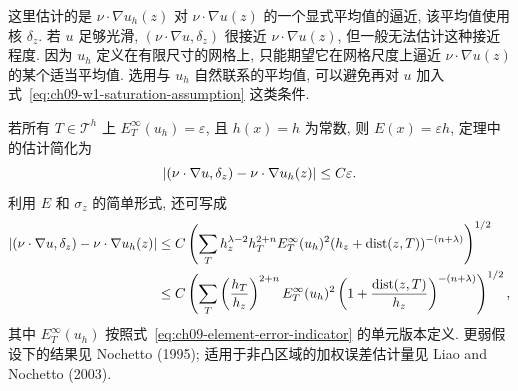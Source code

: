这里估计的是 $\nu\cdot\nabla u_h(z)$ 对 $\nu\cdot\nabla u(z)$ 的一个显式平均值的逼近, 该平均值使用核 $\delta_z$. 若 $u$ 足够光滑, $(\nu\cdot\nabla u,\delta_z)$ 很接近 $\nu\cdot\nabla u(z)$, 但一般无法估计这种接近程度. 因为 $u_h$ 定义在有限尺寸的网格上, 只能期望它在网格尺度上逼近 $\nu\cdot\nabla u(z)$ 的某个适当平均值. 选用与 $u_h$ 自然联系的平均值, 可以避免再对 $u$ 加入式~\eqref{eq:ch09-w1-saturation-assumption} 这类条件.

若所有 $T\in\mathcal T^h$ 上 $E_T^\infty(u_h)=\varepsilon$, 且 $h(x)=h$ 为常数, 则 $E(x)=\varepsilon h$, 定理中的估计简化为
\[
\MathBookFormulaID{formula-ch09-uniform-pointwise-estimator}
|(\nu\cdot\nabla u,\delta_z)-\nu\cdot\nabla u_h(z)|\leq C\varepsilon.
\]
利用 $E$ 和 $\sigma_z$ 的简单形式, 还可写成
\begin{align*}
\MathBookFormulaID{formula-ch09-discrete-pointwise-estimator}
|(\nu\cdot\nabla u,\delta_z)-\nu\cdot\nabla u_h(z)|
&\leq C\left(\sum_T h_z^{\lambda-2}h_T^{2+n}E_T^\infty(u_h)^2
(h_z+\operatorname{dist}(z,T))^{-(n+\lambda)}\right)^{1/2}\\
&\leq C\left(\sum_T\left(\frac{h_T}{h_z}\right)^{2+n}
E_T^\infty(u_h)^2
\left(1+\frac{\operatorname{dist}(z,T)}{h_z}\right)^{-(n+\lambda)}\right)^{1/2},
\end{align*}
其中 $E_T^\infty(u_h)$ 按照式~\eqref{eq:ch09-element-error-indicator} 的单元版本定义. 更弱假设下的结果见 Nochetto (1995); 适用于非凸区域的加权误差估计量见 Liao and Nochetto (2003).

